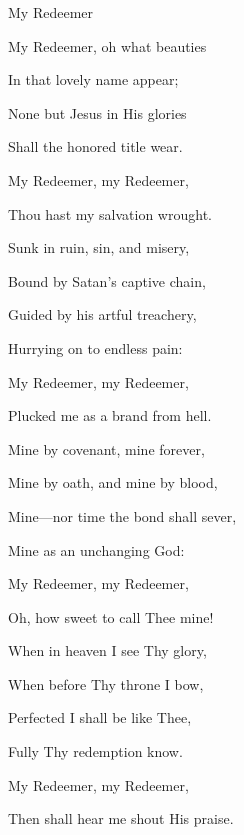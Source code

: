 \documentclass[12pt]{book}
\newcommand{\WBColBrk}{%
  \ifWordBk%
  \newpage%
\fi}
\begin{document}
\begin{song}{My Redeemer}{}
  {\SBPubDom}
  {}
  {}
  {}

  \begin{SBVerse}
    My Redeemer, oh what beauties

    In that lovely name appear;

    None but Jesus in His glories

    Shall the honored title wear.

    My Redeemer, my Redeemer,

    Thou hast my salvation wrought.
  \end{SBVerse}

  \begin{SBVerse}
    Sunk in ruin, sin, and misery,

    Bound by Satan's captive chain,

    Guided by his artful treachery,

    Hurrying on to endless pain:

    My Redeemer, my Redeemer,

    Plucked me as a brand from hell.
  \end{SBVerse}

  \begin{SBVerse}
    Mine by covenant, mine forever,

    Mine by oath, and mine by blood,

    Mine---nor time the bond shall sever,

    Mine as an unchanging God:

    My Redeemer, my Redeemer,

    Oh, how sweet to call Thee mine!
  \end{SBVerse}

  \begin{SBVerse}
    When in heaven I see Thy glory,

    When before Thy throne I bow,

    Perfected I shall be like Thee,

    Fully Thy redemption know.

    My Redeemer, my Redeemer,

    Then shall hear me shout His praise.
  \end{SBVerse}
\end{song}

\WBColBrk
\end{document}
